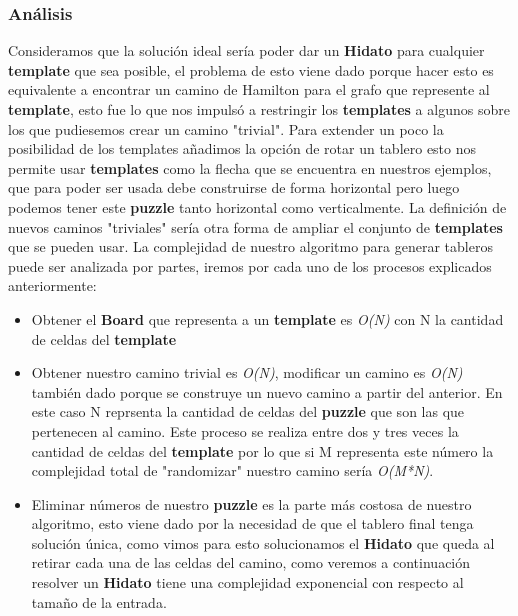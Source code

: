 \documentclass[12pt]{article}
\begin{document}
\subsubsection{An\'alisis}
Consideramos que la soluci\'on ideal ser\'ia poder dar un {\bf Hidato} para cualquier {\bf template} que sea posible, el problema de esto viene dado porque hacer esto es equivalente a encontrar un camino de Hamilton para el grafo que represente al {\bf template}, esto fue lo que nos impuls\'o a restringir los {\bf templates} a algunos sobre los que pudiesemos crear un camino
"trivial". Para extender un poco la posibilidad de los templates a\~nadimos la opci\'on de rotar un tablero esto nos permite usar {\bf templates} como la flecha que se encuentra en nuestros ejemplos, que para poder ser usada debe construirse de forma horizontal pero luego podemos tener este {\bf puzzle} tanto horizontal como verticalmente. La definici\'on de nuevos caminos "triviales"
ser\'ia otra forma de ampliar el conjunto de {\bf templates} que se pueden usar.\newline
La complejidad de nuestro algoritmo para generar tableros puede ser analizada por partes, iremos por cada uno de los procesos explicados anteriormente:
\begin{itemize}
	\item Obtener el {\bf Board} que representa a un {\bf template} es {\it O(N)} con N la cantidad de celdas del {\bf template}
	\item Obtener nuestro camino trivial es {\it O(N)}, modificar un camino es {\it O(N)} tambi\'en dado porque se construye un nuevo camino a partir del anterior. En este caso N reprsenta la cantidad de celdas del {\bf puzzle} que son las que pertenecen al camino. Este proceso se realiza entre dos y tres veces la cantidad de celdas del {\bf template} por lo que si M representa este n\'umero la complejidad total
	de "randomizar" nuestro camino ser\'ia {\it O(M*N)}.
	\item Eliminar n\'umeros de nuestro {\bf puzzle} es la parte m\'as costosa de nuestro algoritmo, esto viene dado por la necesidad de que el tablero final tenga soluci\'on \'unica, como vimos para esto solucionamos el {\bf Hidato} que queda al retirar cada una de las celdas del camino, como veremos a continuaci\'on resolver un {\bf Hidato} tiene una complejidad exponencial con respecto al tama\~no de la entrada.
\end{itemize}
\end{document}
